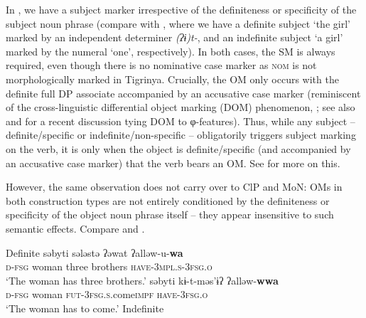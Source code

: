 \documentclass[output=paper]{langscibook}
\begin{document}
In , we have a subject marker irrespective of the definiteness or specificity of the subject noun phrase (compare  with , where we have a definite subject `the girl' marked by an independent determiner \emph{(ʔɨ)t-}, and an indefinite subject `a girl' marked by the numeral `one', respectively). In both cases, the SM is always required, even though there is no nominative case marker as {\scshape nom} is not morphologically marked in Tigrinya. Crucially, the OM only occurs with the definite full DP associate accompanied by an accusative case marker (reminiscent of the cross-linguistic differential object marking (DOM) phenomenon, \citealt{aissen03}; see also \citealt{danon2011} and \citealt{kalin16} for a recent discussion tying DOM to φ-features).
Thus, while any subject -- definite/specific  or indefinite/non-specific  -- obligatorily triggers subject marking on the verb, it is only when the object is definite/specific (and accompanied by an accusative case marker) that the verb bears an OM. See  for more on this.

However, the same observation does not carry over to ClP and MoN: OMs in both construction types are not entirely conditioned by the definiteness or specificity of the object noun phrase itself -- they appear insensitive to such semantic effects.
Compare  and .  

\ea\label{ex:Gebregziabher:modnessdef}Definite 
\ea 
{} səbyti sələstə ʔə\textcrh wat ʔalləw-u-{\textbf{wa}}  \\
{\scshape d-fsg} woman three brothers {\scshape have-3mpl.s-3fsg.o}\\
\glt `The woman has three brothers.'
\ex 
{} səbyti kɨ-t-məs'ɨʔ ʔalləw-{\textbf{wwa}} \\
{\scshape d-fsg} woman {\scshape fut-3fsg.s}.come{\scshape impf} {\scshape have-3fsg.o}\\
\glt `The woman has to come.'
\z
\ex\label{ex:Gebregziabher:modnessindef}Indefinite 
\z
\z
\end{document}

